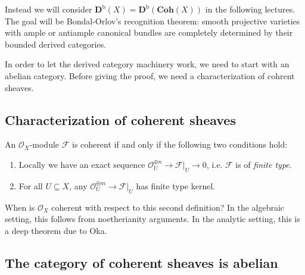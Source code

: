 \documentclass[12pt]{article}
\theoremstyle{darkgreentheorem}
\theoremstyle{darkbluedefinition}
\theoremstyle{darkredexample}
\theoremstyle{remark}
\newcommand{\1}{\mathbbm{1}}
\newcommand{\Db}{\mathbf{D}^{\mathrm{b}}}
\newcommand{\Coh}{\mathbf{Coh}}
\newcommand{\F}{\mathcal{F}}
\renewcommand{\O}{\mathcal{O}}
\newcommand{\op}{\oplus}
\newcommand{\sub}{\subseteq}
\begin{document}
Instead we will consider $\Db(X)=\Db(\Coh(X))$ in the following lectures.
The goal will be Bondal-Orlov's recognition theorem: smooth projective varieties with ample or antiample canonical bundles are completely determined by their bounded derived categories.

In order to let the derived category machinery work, we need to start with an abelian category.
Before giving the proof, we need a characterization of cohrent sheaves.

\subsection{Characterization of coherent sheaves}

An $\O_{X}$-module $\F$ is coherent if and only if the following two conditions hold:
\begin{enumerate}
    \item Locally we have an exact sequence $\O_{U}^{\op n}\to \F|_{U}\to 0$, i.e. $\F$ is of \textit{finite type}.
    \item For all $U\sub X$, any $\O_{U}^{\op m}\to \F|_{U}$ has finite type kernel.
\end{enumerate}

When is $\O_{X}$ coherent with respect to this second definition?
In the algebraic setting, this follows from noetherianity arguments.
In the analytic setting, this is a deep theorem due to Oka.
	    
\subsection{The category of coherent sheaves is abelian}
\end{document}
